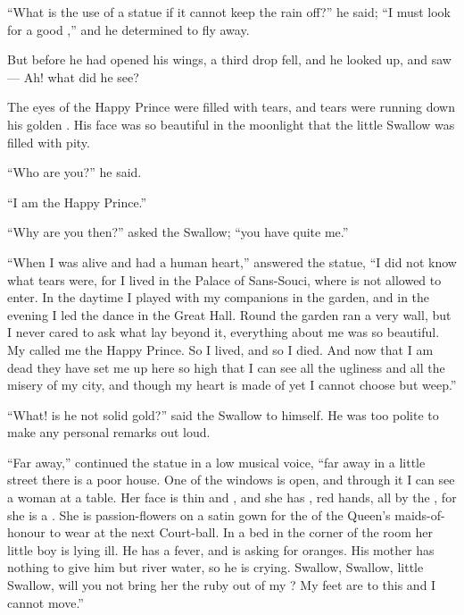 \documentclass[troisieme]{fiche}
\begin{document}
\begin{texte}
``What is the use of a statue if it cannot keep the rain off?'' he said; ``I must look for a
good ,'' and he determined to fly
away.

But before he had opened his wings, a third drop fell, and he looked up, and saw --- Ah! what
did he see?

The eyes of the Happy Prince were filled with tears, and tears were running down his golden
. His face was so beautiful in the moonlight that the little
Swallow was filled with pity.

``Who are you?'' he said.

``I am the Happy Prince.''

``Why are you  then?'' asked the Swallow; ``you have quite
 me.''

``When I was alive and had a human heart,'' answered the statue, ``I did not know what tears
were, for I lived in the Palace of Sans-Souci, where  is not
allowed to enter. In the daytime I played with my companions in the garden, and in the evening
I led the dance in the Great Hall. Round the garden ran a very 
wall, but I never cared to ask what lay beyond it, everything about me was so beautiful. My
 called me the Happy Prince. So I lived, and so I
died. And now that I am dead they have set me up here so high that I can see all the ugliness
and all the misery of my city, and though my heart is made of  yet I
cannot choose but weep.''

``What! is he not solid gold?'' said the Swallow to himself. He was too polite to make any
personal remarks out loud.

``Far away,'' continued the statue in a low musical voice, ``far away in a little street there
is a poor house. One of the windows is open, and through it I can see a woman
 at a table. Her face is thin and , and she has
, red hands, all  by the
, for she is a
. She is
 passion-flowers on a satin gown for the
 of the Queen's maids-of-honour to wear at the
next Court-ball. In a bed in the corner of the room her little boy is lying ill. He has a
fever, and is asking for oranges. His mother has nothing to give him but river water, so he
is crying. Swallow, Swallow, little Swallow, will you not bring her the ruby out of my
? My feet are
 to this  and I cannot
move.''


\end{texte}
\end{document}
